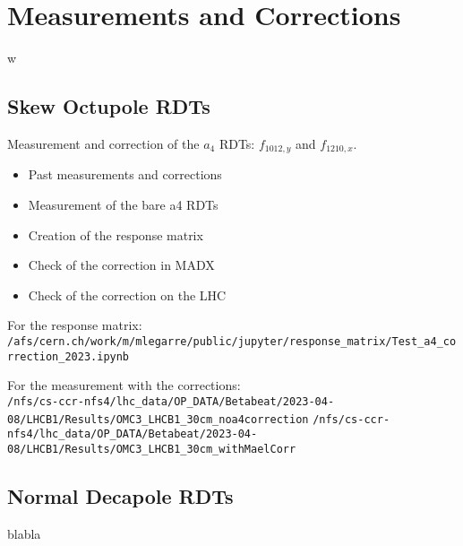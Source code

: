 \section{Measurements and Corrections}

w
\subsection{Skew Octupole RDTs}

Measurement and correction of the $a_4$ RDTs: $f_{1012,y}$ and $f_{1210,x}$.

\begin{itemize}
    \item Past measurements and corrections
    \item Measurement of the bare a4 RDTs
    \item Creation of the response matrix
    \item Check of the correction in MADX
    \item Check of the correction on the LHC
\end{itemize}

For the response matrix: \\
\footnotesize
\verb|/afs/cern.ch/work/m/mlegarre/public/jupyter/response_matrix/Test_a4_correction_2023.ipynb|
\normalsize

For the measurement with the corrections: \\
\footnotesize
\verb|/nfs/cs-ccr-nfs4/lhc_data/OP_DATA/Betabeat/2023-04-08/LHCB1/Results/OMC3_LHCB1_30cm_noa4correction|
\verb|/nfs/cs-ccr-nfs4/lhc_data/OP_DATA/Betabeat/2023-04-08/LHCB1/Results/OMC3_LHCB1_30cm_withMaelCorr|
\normalsize


\subsection{Normal Decapole RDTs}

blabla